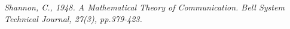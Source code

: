 \documentclass[12pt]{article}
\begin{document}
		
	
	
	 
	
	
		
	
	\pagebreak
	\begin{thebibliography}{1}	
		\textit{Shannon, C., 1948. A Mathematical Theory of Communication. Bell System Technical Journal, 27(3), pp.379-423.}
		
	\end{thebibliography}
\end{document}
